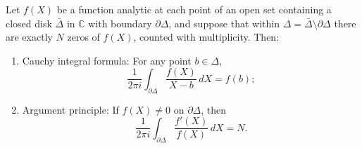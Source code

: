 Let $f(X)$ be a function analytic at each point of an open set containing a closed disk $\bar{\Delta}$ in $\mathbb{C}$ with boundary $\partial \Delta$, and suppose that within $\Delta = \bar{\Delta} \setminus \partial \Delta$ there are exactly $N$ zeros of $f(X)$, counted with multiplicity. Then:

\begin{enumerate}
\item[(1)] Cauchy integral formula:
For any point $b \in \Delta$,
$$\frac{1}{2\pi i} \int_{\partial \Delta} \frac{f(X)}{X - b} \, dX = f(b);$$

\item[(2)] Argument principle:
If $f(X) \neq 0$ on $\partial \Delta$, then
$$\frac{1}{2\pi i} \int_{\partial \Delta} \frac{f'(X)}{f(X)} \, dX = N.$$
\end{enumerate}
